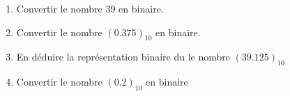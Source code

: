 \documentclass[a4paper,11pt]{article}
\begin{document}
\begin{enumerate}
\item Convertir le nombre 39 en binaire.\\



\item Convertir le nombre $(0.375 )_{10}$ en binaire.\\

\item En déduire la représentation binaire du le nombre $( 39.125 )_{10}$


\item Convertir le nombre $( 0.2)_{10}$ en binaire\\
%
%


\end{enumerate}
\end{document}
